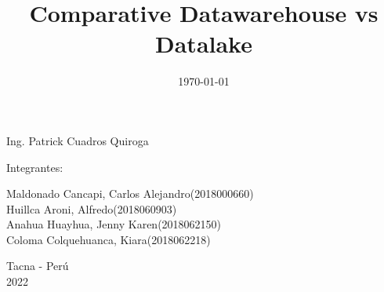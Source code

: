 \documentclass[twoside,twocolumn]{article}
\begin{document}
\begin{titlepage}
\begin{center}
\vspace*{0.1in}
\begin{large}
 Ing. Patrick Cuadros Quiroga\\
\end{large}

\vspace*{0.2in}
\vspace*{0.1in}
\begin{large}

Integrantes: \\
\begin{flushleft}
Maldonado Cancapi, Carlos Alejandro\hfill(2018000660) \\
Huillca Aroni, Alfredo\hfill(2018060903)\\
Anahua Huayhua, Jenny Karen\hfill(2018062150)\\
Coloma Colquehuanca, Kiara\hfill(2018062218)\\

\end{flushleft}
\end{large}

\vspace*{0.1in}
\begin{large}
Tacna - Perú\\
2022
\end{large}
\end{center}
\end{titlepage}

\setlength{\droptitle}{-4\baselineskip} %

\pretitle{\begin{center}\Huge\bfseries} %
\posttitle{\end{center}} %
\title{Comparative Datawarehouse vs Datalake} %

\date{\today} %
\renewcommand{\maketitlehookd}{%

}




\maketitle

\end{document}
